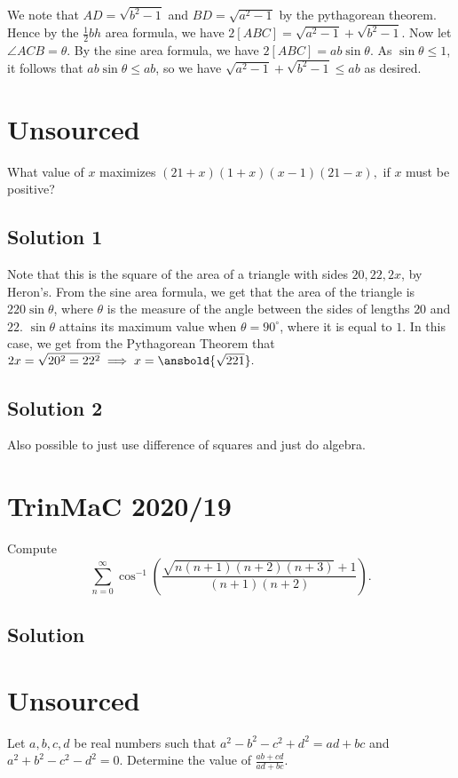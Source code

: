\documentclass{article}
\begin{document}
We note that $AD=\sqrt{b^2-1}$ and $BD=\sqrt{a^2-1}$ by the pythagorean theorem. Hence by the $\frac{1}{2}bh$ area formula, we have $2[ABC]=\sqrt{a^2-1}+\sqrt{b^2-1}$. Now let $\angle ACB=\theta$. By the sine area formula, we have $2[ABC]=ab\sin\theta$. As $\sin\theta\leq 1$, it follows that $ab\sin\theta\leq ab$, so we have $\sqrt{a^2-1}+\sqrt{b^2-1}\leq ab$ as desired.

\pagebreak\section{Unsourced}
What value of $x$ maximizes $(21+x)(1+x)(x-1)(21-x),$ if $x$ must be positive?

\subsection{Solution 1}
Note that this is the square of the area of a triangle with sides $20,22,2x$, by Heron's. From the sine area formula, we get that the area of the triangle is $220\sin\theta$, where $\theta$ is the measure of the angle between the sides of lengths $20$ and $22$. $\sin\theta$ attains its maximum value when $\theta=90^\circ$, where it is equal to $1$. In this case, we get from the Pythagorean Theorem that $2x=\sqrt{20^2=22^2} \implies x=\ansbold{\sqrt{221}}.$

\subsection{Solution 2}
Also possible to just use difference of squares and just do algebra.

\pagebreak\section{TrinMaC 2020/19}
Compute
\[\sum_{n=0}^{\infty}\cos^{-1}\left(\frac{\sqrt{n(n+1)(n+2)(n+3)}+1}{(n+1)(n+2)}\right).\]

\subsection{Solution}

\pagebreak\section{Unsourced}
Let $a,b,c,d$ be real numbers such that $a^2 - b^2 - c^2 + d^2 = ad + bc$ and $a^2 + b^2 - c^2 - d^2 = 0.$ Determine the value of $\frac{ab + cd}{ad + bc}.$
\end{document}
